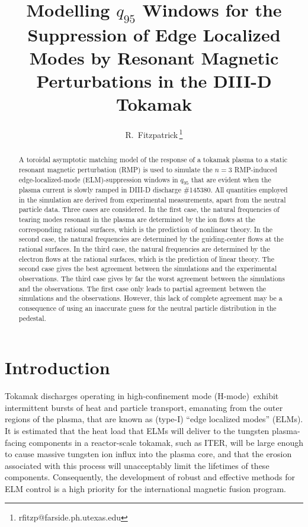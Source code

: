 \documentclass[12pt,prb,aps]{revtex4-1}
\begin{document}
\title {Modelling $q_{95}$ Windows for the Suppression of Edge Localized Modes by Resonant Magnetic Perturbations in the DIII-D Tokamak}

\author{R.~Fitzpatrick\,\footnote{rfitzp@farside.ph.utexas.edu}}

\begin{abstract}
A toroidal asymptotic matching model of the response of a tokamak plasma to a static resonant magnetic perturbation (RMP) is used to simulate the $n=3$ RMP-induced 
edge-localized-mode (ELM)-suppression
windows in $q_{95}$ that are evident when the plasma current is slowly ramped in DIII-D discharge \#145380. All quantities employed in the simulation are
derived from experimental measurements, apart from the neutral particle data. 
Three cases are considered.
In the first case, the natural frequencies of tearing modes resonant in the plasma are 
determined by the ion flows at the corresponding rational surfaces, which is the prediction of nonlinear theory.
In the second case, the natural frequencies are 
determined by the guiding-center flows at the rational surfaces.
 In the third case, the natural frequencies   are 
determined by the electron flows at the  rational surfaces, which is the prediction of linear theory.
The second case gives  the best agreement between the simulations and the  experimental observations.   The third case gives by far the worst agreement between the simulations 
and the  observations. The first case only leads to partial agreement between  the  simulations and the  observations. However, this lack of complete agreement
may be a consequence of using an inaccurate guess for the neutral particle distribution in the pedestal.  
\end{abstract}
 
\maketitle

\section{Introduction}
Tokamak discharges operating in high-confinement mode (H-mode)\,\cite{wagner} exhibit intermittent bursts of heat and particle transport, 
emanating from the outer regions of the plasma, that are known as  (type-I) ``edge localized modes'' (ELMs).\cite{zohm}
It is estimated that the heat load that ELMs
will deliver to the tungsten plasma-facing components in a reactor-scale tokamak, such as ITER, will be large enough to cause
massive tungsten ion influx into the plasma core, and that the erosion associated with this process will 
unacceptably limit the lifetimes of these components.\cite{loarte} Consequently, the development of robust and effective
methods for ELM control is a high priority for the international magnetic fusion program. 
\end{document}
